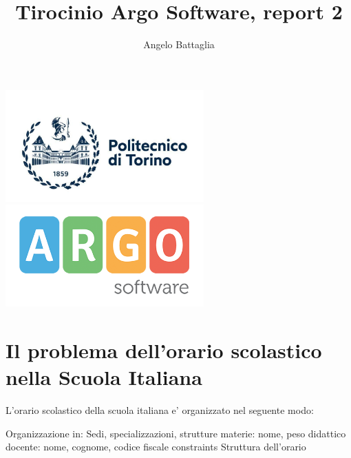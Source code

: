 \documentclass{article}
\author{Angelo Battaglia}
\title{Tirocinio Argo Software, report 2}
\begin{document}
\maketitle

\begin{center}
\includegraphics[width=3in]{polito.jpg}
\includegraphics[width=3in]{og_logoargosoft.png}
\end{center}

\section{Il problema dell'orario scolastico nella Scuola Italiana}
L'orario scolastico della scuola italiana e' organizzato nel
seguente modo: 

Organizzazione in: Sedi, specializzazioni, strutture
materie: nome, peso didattico
docente: nome, cognome, codice fiscale
constraints
Struttura dell'orario

\printbibliography[title = {Bibliografia e crediti}]
\end{document}
